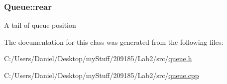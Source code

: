 \subsubsection[{rear}]{\setlength{\rightskip}{0pt plus 5cm}Queue\+::rear\hspace{0.3cm}{\ttfamily [private]}}\label{class_queue_ac09196d6d91d62b8547bae02ae9063c5}
A tail of queue position 

The documentation for this class was generated from the following files\+:\begin{DoxyCompactItemize}
\item 
C\+:/\+Users/\+Daniel/\+Desktop/my\+Stuff/209185/\+Lab2/src/\hyperlink{queue_8h}{queue.\+h}\item 
C\+:/\+Users/\+Daniel/\+Desktop/my\+Stuff/209185/\+Lab2/src/\hyperlink{queue_8cpp}{queue.\+cpp}\end{DoxyCompactItemize}
